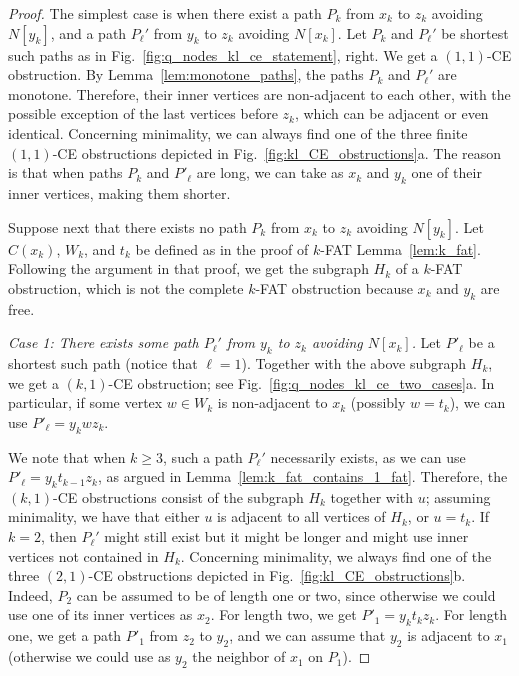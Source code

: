 \begin{proof}
The simplest case is when there exist a path $P_k$ from $x_k$ to $z_k$ avoiding $N[y_k]$, and a path
$P_\ell'$ from $y_k$ to $z_k$ avoiding $N[x_k]$. Let $P_k$ and $P_\ell'$ be shortest such paths as
in Fig.~\ref{fig:q_nodes_kl_ce_statement}, right. We get a $(1,1)$-CE obstruction. By
Lemma~\ref{lem:monotone_paths}, the paths $P_k$ and $P_\ell'$ are monotone. Therefore, their inner
vertices are non-adjacent to each other, with the possible exception of the last vertices before
$z_k$, which can be adjacent or even identical. Concerning minimality, we can always find one of the
three finite $(1,1)$-CE obstructions depicted in Fig.~\ref{fig:kl_CE_obstructions}a. The reason is
that when paths $P_k$ and $P'_\ell$ are long, we can take as $x_k$ and $y_k$ one of their inner
vertices, making them shorter.

Suppose next that there exists no path $P_k$ from $x_k$ to $z_k$ avoiding $N[y_k]$.  Let $C(x_k)$,
$W_k$, and $t_k$ be defined as in the proof of $k$-FAT Lemma~\ref{lem:k_fat}. Following the argument
in that proof, we get the subgraph $H_k$ of a $k$-FAT obstruction, which is not the complete $k$-FAT
obstruction because $x_k$ and $y_k$ are free. 

\emph{Case 1: There exists some path $P_\ell'$ from $y_k$ to $z_k$ avoiding $N[x_k]$.} Let $P'_\ell$
be a shortest such path (notice that $\ell = 1$). Together with the above subgraph $H_k$, we get a $(k,1)$-CE
obstruction; see Fig.~\ref{fig:q_nodes_kl_ce_two_cases}a. In particular, if some vertex $w \in W_k$
is non-adjacent to $x_k$ (possibly $w = t_k$), we can use $P'_\ell = y_kwz_k$. 

We note that when $k \ge 3$, such a path $P_\ell'$ necessarily exists, as we can use $P'_\ell =
y_kt_{k-1}z_k$, as argued in Lemma~\ref{lem:k_fat_contains_1_fat}. Therefore, the $(k,1)$-CE
obstructions consist of the subgraph $H_k$ together with $u$; assuming minimality, we have that
either $u$ is adjacent to all vertices of $H_k$, or $u = t_k$.  If $k = 2$, then $P_\ell'$ might
still exist but it might be longer and might use inner vertices not contained in $H_k$. Concerning
minimality, we always find one of the three $(2,1)$-CE obstructions depicted in
Fig.~\ref{fig:kl_CE_obstructions}b. Indeed, $P_2$ can be assumed to be of length one or two, since
otherwise we could use one of its inner vertices as $x_2$. For length two, we get $P'_1 =
y_kt_kz_k$. For length one, we get a path $P'_1$ from $z_2$ to $y_2$, and we can assume that $y_2$
is adjacent to $x_1$ (otherwise we could use as $y_2$ the neighbor of $x_1$ on $P_1$).


\end{proof}

